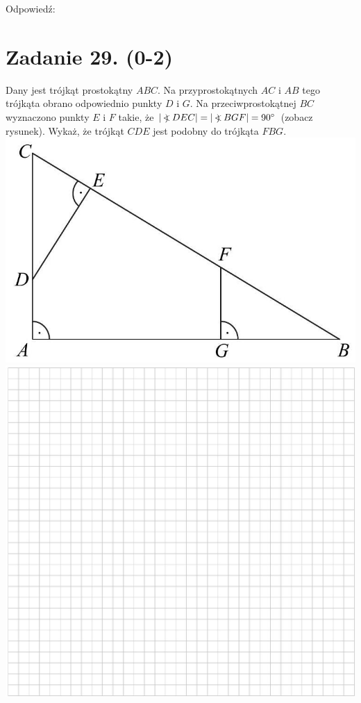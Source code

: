 \documentclass[10pt]{article}
\newcommand\Varangle{\mathop{{<\!\!\!\!\!\text{\small)}}\:}\nolimits}
\begin{document}
Odpowiedź:

\section*{Zadanie 29. (0-2)}
Dany jest trójkąt prostokątny \(A B C\). Na przyprostokątnych \(A C\) i \(A B\) tego trójkąta obrano odpowiednio punkty \(D\) i \(G\). Na przeciwprostokątnej \(B C\) wyznaczono punkty \(E\) i \(F\) takie, że \(|\Varangle D E C|=|\Varangle B G F|=90^{\circ}\) (zobacz rysunek). Wykaż, że trójkąt \(C D E\) jest podobny do trójkąta \(F B G\).\\
\includegraphics[max width=\textwidth, center]{2024_11_21_1c92fcc0db78c9202015g-15}\\
\includegraphics[max width=\textwidth, center]{2024_11_21_1c92fcc0db78c9202015g-15(1)}
\end{document}
